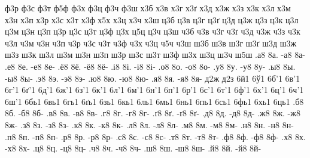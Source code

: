 {ф3р
ф3с
ф3т
ф5ф
ф3х
ф3ц
ф3ч
ф3ш
х3б
х3в
х3г
х3ґ
х3д
х3ж
х3з
х3к
х3л
х3м
х3н
х3п
х3р
х3с
х3т
х3ф
х5х
х3ц
х3ч
х3ш
ц3б
ц3в
ц3г
ц3ґ
ц3д
ц3ж
ц3з
ц3к
ц3л
ц3м
ц3н
ц3п
ц3р
ц3с
ц3т
ц3ф
ц3х
ц5ц
ц3ч
ц3ш
ч3б
ч3в
ч3г
ч3ґ
ч3д
ч3ж
ч3з
ч3к
ч3л
ч3м
ч3н
ч3п
ч3р
ч3с
ч3т
ч3ф
ч3х
ч3ц
ч5ч
ч3ш
ш3б
ш3в
ш3г
ш3ґ
ш3д
ш3ж
ш3з
ш3к
ш3л
ш3м
ш3н
ш3п
ш3р
ш3с
ш3т
ш3ф
ш3х
ш3ц
ш3ч
ш5ш
%
%
%
.а8 8а. -а8 8а-
.е8 8е. -е8 8е-
.ё8 8ё. -ё8 8ё-
.і8 8і. -і8 8і-
.о8 8о. -о8 8о-
.у8 8у. -у8 8у-
.ы8 8ы. -ы8 8ы-
.э8 8э. -э8 8э-
.ю8 8ю. -ю8 8ю-
.я8 8я. -я8 8я-
%
%
%
д2ж
д2з
%
%
%
6й1
6ў1
%
%
%
6б'1
6в'1
6г'1
6ґ'1
6д'1
6ж'1
6з'1
6к'1
6л'1
6м'1
6н'1
6п'1
6р'1
6с'1
6т'1
6ф'1
6х'1
6ц'1
6ч'1
6ш'1
6бь1
6вь1
6гь1
6ґь1
6зь1
6кь1
6ль1
6мь1
6нь1
6пь1
6сь1
6фь1
6хь1
6ць1
%
%
.б8 8б. -б8 8б-
.в8 8в. -в8 8в-
.г8 8г. -г8 8г-
.ґ8 8ґ. -ґ8 8ґ-
.д8 8д. -д8 8д-
.ж8 8ж. -ж8 8ж-
.з8 8з. -з8 8з-
.к8 8к. -к8 8к-
.л8 8л. -л8 8л-
.м8 8м. -м8 8м-
.н8 8н. -н8 8н-
.п8 8п. -п8 8п-
.р8 8р. -р8 8р-
.с8 8с. -с8 8с-
.т8 8т. -т8 8т-
.ф8 8ф. -ф8 8ф-
.х8 8х. -х8 8х-
.ц8 8ц. -ц8 8ц-
.ч8 8ч. -ч8 8ч-
.ш8 8ш. -ш8 8ш-
.й8 8й. -й8 8й-
}
